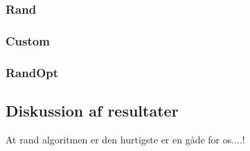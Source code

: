 \subsubsection{Rand}

\subsubsection{Custom}

\subsubsection{RandOpt}

\subsection{Diskussion af resultater}
At rand algoritmen er den hurtigste er en gåde for os....!
